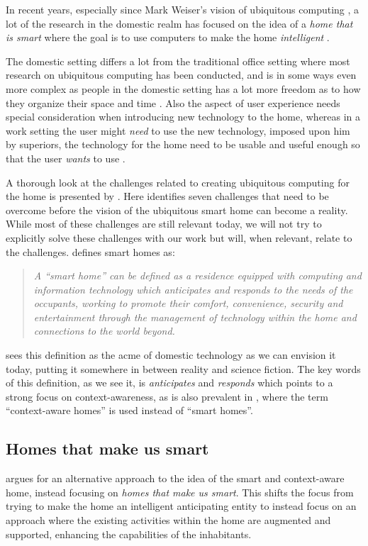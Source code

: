 In recent years, especially since Mark Weiser's vision of ubiquitous computing \citep{weiser1991computer}, a lot of the research in the domestic realm has focused on the idea of a \emph{home that is smart} where the goal is to use computers to make the home \emph{intelligent} \citep{taylor2007homes}.

The domestic setting differs a lot from the traditional office setting where most research on ubiquitous computing has been conducted, and is in some ways even more complex as people in the domestic setting has a lot more freedom as to how they organize their space and time \cite{meyer2003survey}.
Also the aspect of user experience needs special consideration when introducing new technology to the home, whereas in a work setting the user might \emph{need} to use the new technology, imposed upon him by superiors, the technology for the home need to be usable and useful enough so that the user \emph{wants} to use \citep{meyer2003survey}.

A thorough look at the challenges related to creating ubiquitous computing for the home is presented by \citet{edwards2001home}.
Here \citeauthor{edwards2001home} identifies seven challenges that need to be overcome before the vision of the ubiquitous smart home can become a reality. 
While most of these challenges are still relevant today, we will not try to explicitly solve these challenges with our work but will, when relevant, relate to the challenges.
\blank
\citet{aldrich2003smart} defines smart homes as:

\begin{quotation}
\emph{A ``smart home'' can be defined as a residence equipped with computing and information technology which anticipates and responds to the needs of the occupants, working to promote their comfort, convenience, security and entertainment through the management of technology within the home and connections to the world beyond.}
\end{quotation}
\citeauthor{aldrich2003smart} sees this definition as the acme of domestic technology as we can envision it today, putting it somewhere in between reality and science fiction.
The key words of this definition, as we see it, is \emph{anticipates} and \emph{responds} which points to a strong focus on context-awareness, as is also prevalent in \citep{meyer2003survey}, where the term ``context-aware homes'' is used instead of ``smart homes''. 

\subsection{Homes that make us smart}
\citet{taylor2007homes} argues for an alternative approach to the idea of the smart and context-aware home, instead focusing on \emph{homes that make us smart}. 
This shifts the focus from trying to make the home an intelligent anticipating entity to instead focus on an approach where the existing activities within the home are augmented and supported, enhancing the capabilities of the inhabitants.

